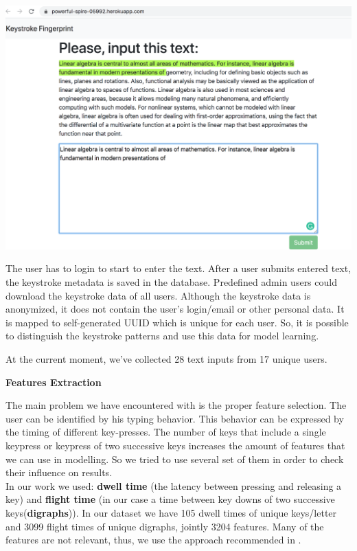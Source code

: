 \documentclass[12pt,a4]{article}
\begin{document}
\begin{center}
	\includegraphics[width=0.9\linewidth]{images/web-app.png}
	\label{fig:web-app.png}
\end{center}
The user has to login to start to enter the text. After a user submits entered text, the keystroke metadata is saved in the database. 
Predefined admin users could download the keystroke data of all users. Although the keystroke data is anonymized, it does not contain the user's login/email or other personal data. It is mapped to self-generated UUID which is unique for each user. So, it is possible to distinguish the keystroke patterns and use this data for model learning.

At the current moment, we've collected 28 text inputs from 17 unique users.

\bigskip
\large\textbf{Features Extraction}
\bigskip

\normalsize

The main problem we have encountered with is the proper feature selection. The user can be identified by his typing behavior. This behavior can be expressed by the timing of different key-presses. The number of keys that include a single keypress or keypress of two successive keys increases the amount of features that we can use in modelling. So we tried to use several set of them in order to check their influence on results. \\

In our work we used: \textbf{dwell time} (the latency between pressing and releasing a key) and \textbf{flight time} (in our case a time between key downs of two successive keys(\textbf{digraphs})). In our dataset we have 105 dwell times of unique keys/letter and 3099 flight times of unique digraphs, jointly 3204 features. Many of the features are not relevant, thus, we use the approach recommended in \cite{tappert2012keystroke}. \\
\end{document}
